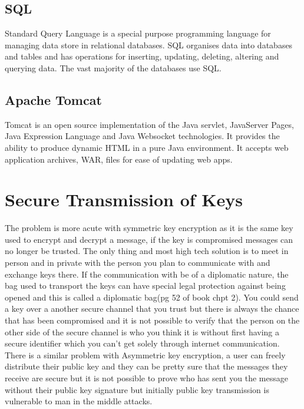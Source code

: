 \subsection{SQL}

Standard Query Language is a special purpose programming language for managing data store in relational databases. SQL organises data into databases and tables and has operations for inserting, updating, deleting, altering and querying data. The vast majority of the databases use SQL.

\subsection{Apache Tomcat}

Tomcat is an open source implementation of the Java servlet, JavaServer Pages, Java Expression Language and Java Websocket technologies. It provides the ability to produce dynamic HTML in a pure Java environment. It accepts web application archives, WAR, files for ease of updating web apps.

\section{Secure Transmission of Keys}

The problem is more acute with symmetric key encryption as it is the same key used to encrypt and decrypt a message, if the key is compromised messages can no longer be trusted. The only thing and most high tech solution is to meet in person and in private with the person you plan to communicate with and exchange keys there. If the communication with be of a diplomatic nature, the bag used to transport the keys can have special legal protection against being opened and this is called a diplomatic bag(pg 52 of book chpt 2). You could send a key over a another secure channel that you trust but there is always the chance that has been compromised and it is not possible to verify that the person on the other side of the secure channel is who you think it is without first having a secure identifier which you can't get solely through internet communication. There is a similar problem with Asymmetric key encryption, a user can freely distribute their public key and they can be pretty sure that the messages they receive are secure but it is not possible to prove who has sent you the message without their public key signature but initially public key transmission is vulnerable to man in the middle attacks.
